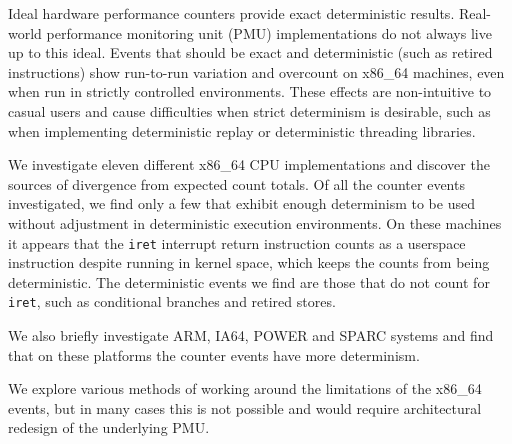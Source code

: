 Ideal hardware performance counters provide exact deterministic results.
Real-world performance monitoring unit (PMU) implementations
do not always live up to this ideal.
Events that should be exact and deterministic 
(such as retired instructions) show run-to-run 
variation and overcount on x86\_64 machines, even when 
run in strictly controlled environments. 
These effects are non-intuitive to casual users and 
cause difficulties when strict determinism is desirable,
such as when implementing
deterministic replay or deterministic threading libraries.

We investigate eleven different x86\_64 CPU implementations and
discover the sources of divergence from expected count totals.  
Of all the counter events investigated, we find only a few
that exhibit enough determinism to be used without adjustment in
deterministic execution environments.  
On these machines it appears that the {\tt iret} interrupt return
instruction counts as a userspace instruction despite running
in kernel space, which keeps the counts from being deterministic.
The deterministic events we find are those
that do not count for {\tt iret}, such as conditional branches
and retired stores.

We also briefly investigate ARM, IA64, POWER and SPARC systems
and find that on these platforms the counter events have more
determinism.  

We explore various methods of working around the limitations 
of the x86\_64 events, but in many cases this is not possible
and would require architectural redesign of the underlying
PMU.
